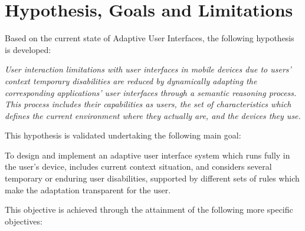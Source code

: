 \section{Hypothesis, Goals and Limitations}
\label{sec:hypothesis}
Based on the current state of Adaptive User Interfaces, the following hypothesis
is developed:
 
\begin{framed}
\textit{User interaction limitations with user interfaces in mobile devices due 
to users' context temporary disabilities are reduced by dynamically adapting the 
corresponding applications' user interfaces through a semantic reasoning process. 
This process includes their capabilities as users, the set of characteristics 
which defines the current environment where they actually are, and the devices 
they use. }
\end{framed}

This hypothesis is validated undertaking the following main goal:

\begin{framed}
 To design and implement an adaptive user interface system which runs fully in
 the user's device, includes current context situation, and considers several
 temporary or enduring user disabilities, supported by different sets of rules
 which make the adaptation transparent for the user.
\end{framed}


This objective is achieved through the attainment of the following more specific
objectives:

